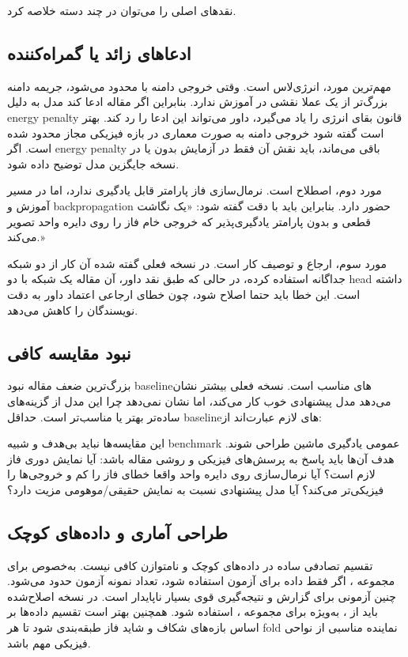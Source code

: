 نقدهای اصلی را می‌توان در چند دسته خلاصه کرد.

\subsection{ادعاهای زائد یا گمراه‌کننده}
مهم‌ترین مورد، انرژی‌لاس است. وقتی خروجی دامنه با  محدود می‌شود، جریمه دامنه بزرگ‌تر از یک عملا نقشی در آموزش ندارد. بنابراین اگر مقاله ادعا کند مدل به دلیل energy penalty قانون بقای انرژی را یاد می‌گیرد، داور می‌تواند این ادعا را رد کند. بهتر است گفته شود خروجی دامنه به صورت معماری در بازه فیزیکی مجاز محدود شده است. اگر energy penalty باقی می‌ماند، باید نقش آن فقط در آزمایش بدون  یا در نسخه جایگزین مدل توضیح داده شود.

مورد دوم، اصطلاح  است. نرمال‌سازی فاز پارامتر قابل یادگیری ندارد، اما در مسیر آموزش و backpropagation حضور دارد. بنابراین باید با دقت گفته شود: «یک نگاشت قطعی و بدون پارامتر یادگیری‌پذیر که خروجی خام فاز را روی دایره واحد تصویر می‌کند.»

مورد سوم، ارجاع و توصیف کار  است. در نسخه فعلی گفته شده آن کار از دو شبکه جداگانه استفاده کرده، در حالی که طبق نقد داور، آن مقاله یک شبکه با دو head داشته است. این خطا باید حتما اصلاح شود، چون خطای ارجاعی اعتماد داور به دقت نویسندگان را کاهش می‌دهد.

\subsection{نبود مقایسه کافی}
بزرگ‌ترین ضعف مقاله نبود baselineهای مناسب است. نسخه فعلی بیشتر نشان می‌دهد مدل پیشنهادی خوب کار می‌کند، اما نشان نمی‌دهد چرا این مدل از گزینه‌های ساده‌تر بهتر یا مناسب‌تر است. حداقل baselineهای لازم عبارت‌اند از:


این مقایسه‌ها نباید بی‌هدف و شبیه benchmark عمومی یادگیری ماشین طراحی شوند. هدف آن‌ها باید پاسخ به پرسش‌های فیزیکی و روشی مقاله باشد: آیا نمایش دوری فاز لازم است؟ آیا نرمال‌سازی روی دایره واحد واقعا خطای فاز را کم و خروجی‌ها را فیزیکی‌تر می‌کند؟ آیا مدل پیشنهادی نسبت به نمایش حقیقی/موهومی مزیت دارد؟

\subsection{طراحی آماری و داده‌های کوچک}
تقسیم تصادفی ساده در داده‌های کوچک و نامتوازن کافی نیست. به‌خصوص برای مجموعه ، اگر فقط  داده برای آزمون استفاده شود، تعداد نمونه آزمون حدود  می‌شود. چنین آزمونی برای گزارش  و نتیجه‌گیری قوی بسیار ناپایدار است. در نسخه اصلاح‌شده باید از ، به‌ویژه برای مجموعه ، استفاده شود. همچنین بهتر است تقسیم داده‌ها بر اساس بازه‌های شکاف و شاید فاز طبقه‌بندی شود تا هر fold نماینده مناسبی از نواحی فیزیکی مهم باشد.


